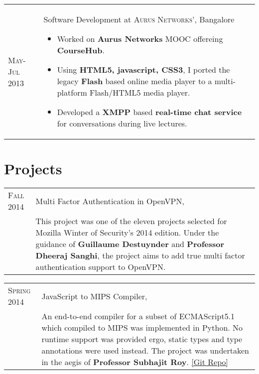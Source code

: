 \documentclass[a4paper,10pt]{article} %
\begin{document}
\begin{tabular}{>{\raggedleft}p{2.2cm}|p{15cm}}
    \textsc{May-Jul 2013} & Software Development at \textsc{Aurus Networks'}, Bangalore
                            \footnotesize{
                                \begin{itemize}[leftmargin=*]
                                    \item Worked on \textbf{Aurus Networks} MOOC offereing \textbf{CourseHub}.
                                    \item Using \textbf{HTML5, javascript, CSS3}, I ported the legacy
                                          \textbf{Flash} based online media player to a multi-platform
                                          Flash/HTML5 media player.
                                      \item Developed a \textbf{XMPP} based \textbf{real-time chat service} for
                                          conversations during live lectures.
                                \end{itemize}
                            }
\end{tabular}

\section{Projects}

\begin{tabular}{>{\raggedleft}p{2.2cm}|p{15cm}}
    \textsc{Fall 2014} & Multi Factor Authentication in OpenVPN, \textsc{\raggedright Mozilla Winter of Security} \\
                         & \footnotesize{This project was one of the eleven
                            projects selected for Mozilla Winter of Security's 2014 edition. Under the
                            guidance of \textbf{Guillaume Destuynder} and \textbf{Professor Dheeraj Sanghi},
                            the project aims to add true multi factor authentication support to OpenVPN.} \\
\end{tabular}

\begin{tabular}{>{\raggedleft}p{2.2cm}|p{15cm}}
    \textsc{Spring 2014} & JavaScript to MIPS Compiler, \textsc{\raggedright Compilers} \\
                         & \footnotesize{An end-to-end compiler for a subset of ECMAScript5.1
                            which compiled to MIPS was implemented in Python. No runtime support
                            was provided ergo, static types and type annotations were used instead.
                            The project was undertaken in the aegis of \textbf{Professor Subhajit Roy}.
                            \href{https://github.com/srijanshetty/javascript-compiler} {[Git Repo]}} \\
\end{tabular}
\end{document}
